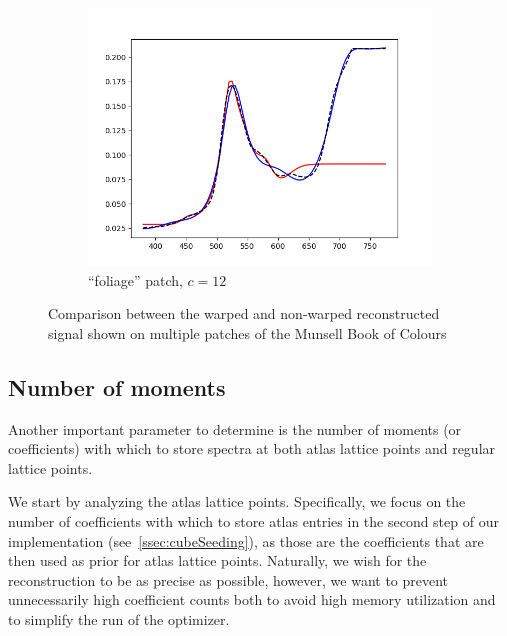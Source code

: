 \begin{figure}[t]
\begin{subfigure}[t]{0.45\textwidth}
		\includegraphics[width=\linewidth]{img/results_techniqueFoliage.png}
		\caption{``foliage'' patch, $c = 12$}
		\label{fig:resultsWarping_foliage}
	\end{subfigure}
	\caption{Comparison between the warped and non-warped reconstructed signal shown on multiple patches of the Munsell Book of Colours}
	\label{fig:resultsWarping}
\end{figure}

\subsection{Number of moments} \label{ssec:noOfMoments}

Another important parameter to determine is the number of moments (or coefficients) with which to store spectra at both atlas lattice points and regular lattice points.

We start by analyzing the atlas lattice points. Specifically, we focus on the number of coefficients with which to store atlas entries in the second step of our implementation (see~\cref{ssec:cubeSeeding}), as those are the coefficients that are then used as prior for atlas lattice points. Naturally, we wish for the reconstruction to be as precise as possible, however, we want to prevent unnecessarily high coefficient counts both to avoid high memory utilization and to simplify the run of the optimizer.

